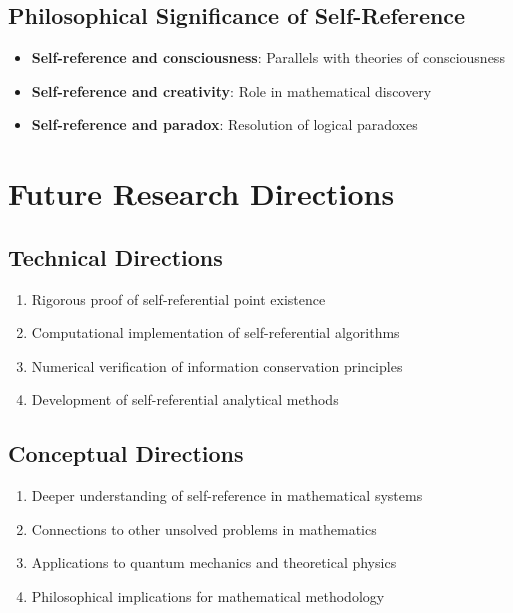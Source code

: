 \documentclass[12pt]{article}
\theoremstyle{plain}
\theoremstyle{definition}
\begin{document}
\subsection{Philosophical Significance of Self-Reference}

\begin{itemize}
\item \textbf{Self-reference and consciousness}: Parallels with theories of consciousness
\item \textbf{Self-reference and creativity}: Role in mathematical discovery
\item \textbf{Self-reference and paradox}: Resolution of logical paradoxes
\end{itemize}

\section{Future Research Directions}

\subsection{Technical Directions}

\begin{enumerate}
\item Rigorous proof of self-referential point existence
\item Computational implementation of self-referential algorithms
\item Numerical verification of information conservation principles
\item Development of self-referential analytical methods
\end{enumerate}

\subsection{Conceptual Directions}

\begin{enumerate}
\item Deeper understanding of self-reference in mathematical systems
\item Connections to other unsolved problems in mathematics
\item Applications to quantum mechanics and theoretical physics
\item Philosophical implications for mathematical methodology
\end{enumerate}
\end{document}
